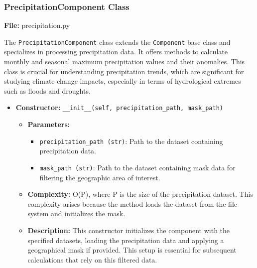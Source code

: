 \documentclass[a4paper,12pt]{article}
\begin{document}
\subsubsection{PrecipitationComponent Class}
\textbf{File:} precipitation.py

The \texttt{PrecipitationComponent} class extends the \texttt{Component} base class and specializes in processing precipitation data. It offers methods to calculate monthly and seasonal maximum precipitation values and their anomalies. This class is crucial for understanding precipitation trends, which are significant for studying climate change impacts, especially in terms of hydrological extremes such as floods and droughts.

\begin{itemize}
    \item \textbf{Constructor:} \texttt{\_\_init\_\_(self, precipitation\_path, mask\_path)}
    \begin{itemize}
        \item \textbf{Parameters:}
        \begin{itemize}
            \item \texttt{precipitation\_path (str)}: Path to the dataset containing precipitation data.
            \item \texttt{mask\_path (str)}: Path to the dataset containing mask data for filtering the geographic area of interest.
        \end{itemize}
        \item \textbf{Complexity:} O(P), where P is the size of the precipitation dataset. This complexity arises because the method loads the dataset from the file system and initializes the mask.
        \item \textbf{Description:} This constructor initializes the component with the specified datasets, loading the precipitation data and applying a geographical mask if provided. This setup is essential for subsequent calculations that rely on this filtered data.
    \end{itemize}


\end{itemize}
\end{document}
